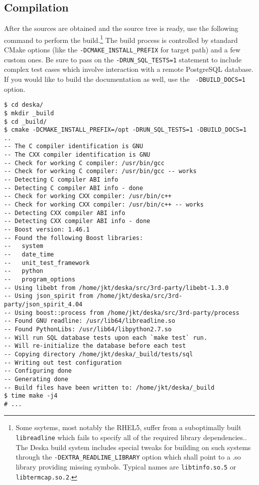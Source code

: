 \documentclass[deska]{subfiles}
\begin{document}
\subsection{Compilation}

After the sources are obtained and the source tree is ready, use the following command to perform the
build.\footnote{Some ssytems, most notably the RHEL5, suffer from a suboptimally built {\tt libreadline} which fails to
specify all of the required library dependencies.\cite{rhel5-readline-bug}.  The Deska build system includes special
tweaks for building on such systems through the {\tt -DEXTRA\_READLINE\_LIBRARY} option which shall point to a .so
library providing missing symbols.  Typical names are {\tt libtinfo.so.5} or {\tt libtermcap.so.2}.}  The build
process is controlled by standard CMake options (like the {\tt -DCMAKE\_INSTALL\_PREFIX} for target path) and a few
custom ones.  Be sure to pass on the {\tt -DRUN\_SQL\_TESTS=1} statement to include complex test cases which involve
interaction with a remote PostgreSQL database.  If you would like to build the documentation as well, use the {\tt
-DBUILD\_DOCS=1} option.

\begin{verbatim}
$ cd deska/
$ mkdir _build
$ cd _build/
$ cmake -DCMAKE_INSTALL_PREFIX=/opt -DRUN_SQL_TESTS=1 -DBUILD_DOCS=1 ..
-- The C compiler identification is GNU
-- The CXX compiler identification is GNU
-- Check for working C compiler: /usr/bin/gcc
-- Check for working C compiler: /usr/bin/gcc -- works
-- Detecting C compiler ABI info
-- Detecting C compiler ABI info - done
-- Check for working CXX compiler: /usr/bin/c++
-- Check for working CXX compiler: /usr/bin/c++ -- works
-- Detecting CXX compiler ABI info
-- Detecting CXX compiler ABI info - done
-- Boost version: 1.46.1
-- Found the following Boost libraries:
--   system
--   date_time
--   unit_test_framework
--   python
--   program_options
-- Using libebt from /home/jkt/deska/src/3rd-party/libebt-1.3.0
-- Using json_spirit from /home/jkt/deska/src/3rd-party/json_spirit_4.04
-- Using boost::process from /home/jkt/deska/src/3rd-party/process
-- Found GNU readline: /usr/lib64/libreadline.so
-- Found PythonLibs: /usr/lib64/libpython2.7.so
-- Will run SQL database tests upon each `make test` run.
-- Will re-initialize the database before each test
-- Copying directory /home/jkt/deska/_build/tests/sql
-- Writing out test configuration
-- Configuring done
-- Generating done
-- Build files have been written to: /home/jkt/deska/_build
$ time make -j4
# ...
\end{verbatim}
\end{document}

